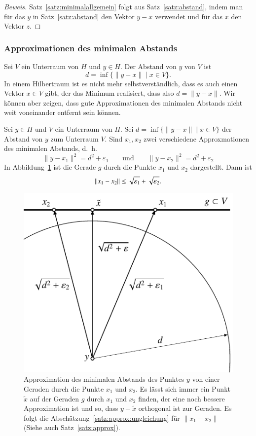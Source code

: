 \begin{proof}[Beweis]
Satz~\ref{satz:minimalallgemein} folgt aus Satz~\ref{satz:abstand}, indem
man für das $y$ in Satz~\ref{satz:abstand} den Vektor $y-x$ verwendet und
für das $x$ den Vektor $z$.
\end{proof}

\subsubsection{Approximationen des minimalen Abstands}
Sei $V$ ein Unterraum von $H$ und $y\in H$.
Der Abstand von $y$ von $V$ ist
\[
d = \inf \{ \| y - x\| \;|\; x \in V\}.
\]
In einem Hilbertraum ist es nicht mehr selbstverständlich, dass es auch
einen Vektor $x\in V$ gibt, der das Minimum realisiert, dass also
$ d = \|y-x\|$.
Wir können aber zeigen, dass gute Approximationen des minimalen Abstands
nicht weit voneinander entfernt sein können.

\begin{satz}
\label{satz:approx}
Sei $y\in H$ und $V$ ein Unterraum von $H$.
Sei $d=\inf \{ \|y-x\| \;|\;x\in V\}$ der Abstand von $y$ zum Unterraum $V$.
Sind $x_1,x_2$ zwei verschiedene Approxmationen des minimalen Abstands, d.~h.
\[
\| y-x_1\|^2 = d^2+\varepsilon_1
\qquad\text{und}\qquad
\| y-x_2\|^2 = d^2+\varepsilon_2
\]
In Abbildung~\ref{figure:approx} ist die Gerade $g$ durch die Punkte $x_1$
und $x_2$ dargestellt.
Dann ist 
\begin{equation}
\|x_1-x_2\| \le \sqrt{\mathstrut\varepsilon_1}+\sqrt{\mathstrut\varepsilon_2}.
\label{satz:approx:ungleichung}
\end{equation}
\end{satz}

\begin{figure}
\centering
\includegraphics{chapters/1-geometrie/images/approx.pdf}
\caption{Approximation des minimalen Abstands des Punktes $y$ von
einer Geraden durch die Punkte $x_1$ und $x_2$.
Es lässt sich immer ein Punkt $\tilde{x}$ auf der Geraden $g$ durch
$x_1$ und $x_2$ finden, der eine noch bessere Approximation ist und so,
dass $y-\tilde{x}$ orthogonal ist zur Geraden.
Es folgt die Abschätzung~\eqref{satz:approx:ungleichung} für 
$\|x_1-x_2\|$ (Siehe auch Satz~\ref{satz:approx}).
\label{figure:approx}}
\end{figure}


